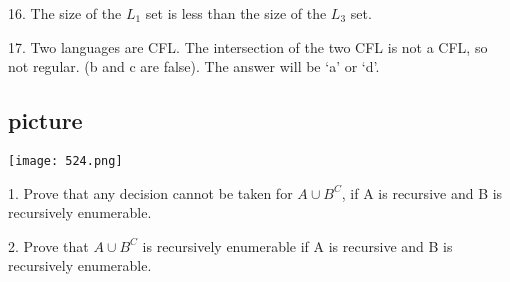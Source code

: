 \documentclass[11pt]{article}
\begin{document}
16. The size of the $L _{1}$ set is less than the size of the $L _{3}$ set.\\
\vspace*{0.2cm}

17. Two languages are CFL. The intersection of the two CFL is not a CFL, so not regular. (b and c are
false). The answer will be ‘a’ or ‘d’.\\
\vspace*{0.1cm}

\begin{center}
\section{picture}
\texttt{[image: 524.png]}
\end{center}

1. Prove that any decision cannot be taken for $A \cup B ^{C}$, if A is recursive and B is recursively enumerable.\\
\vspace*{0.2cm}

2. Prove that $A \cup B ^{C}$ is recursively enumerable if A is recursive and B is recursively enumerable.\\
\end{document}
